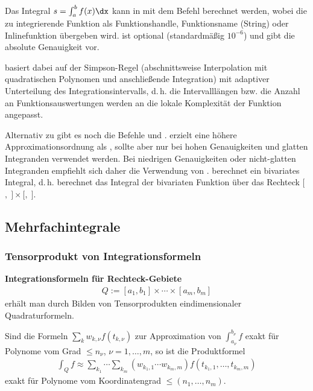 Das Integral $s = \int_a^b f(x)\dx$ kann in \matlab{} mit dem Befehl
 berechnet werden,
wobei die zu integrierende Funktion  als Funktionshandle, Funktionsname
(String) oder Inlinefunktion übergeben wird.
 ist optional (standardmäßig $10^{-6}$) und gibt die absolute
Genauigkeit vor.

 basiert dabei auf der Simpson-Regel
(abschnittsweise Interpolation mit quadratischen Polynomen und anschließende
Integration) mit adaptiver Unterteilung des Integrationsintervalls, d.\,h.
die Intervalllängen bzw. die Anzahl an Funktionsauswertungen werden an
die lokale Komplexität der Funktion angepasst.

Alternativ zu  gibt es noch die Befehle  und
.
 erzielt eine höhere Approximationsordnung als ,
sollte aber nur bei hohen Genauigkeiten und glatten Integranden verwendet
werden.
Bei niedrigen Genauigkeiten oder nicht-glatten Integranden empfiehlt sich daher
die Verwendung von .
 berechnet ein bivariates Integral, d.\,h.
 berechnet
das Integral der bivariaten Funktion  über das Rechteck
$[$$,\;$$] \times [$$,\;$$]$.

\pagebreak

\subsection{%
    Mehrfachintegrale%
}

\subsubsection{%
    Tensorprodukt von Integrationsformeln%
}

\textbf{Integrationsformeln für Rechteck-Gebiete}
\begin{align*}
    Q := [a_1, b_1] \times \dotsb \times [a_m, b_m]
\end{align*}
erhält man durch Bilden von Tensorprodukten eindimensionaler Quadraturformeln.

Sind die Formeln $\sum_k w_{k,\nu} f(t_{k,\nu})$ zur Approximation von
$\int_{a_\nu}^{b_\nu} f$ exakt für Polynome vom Grad $\le n_\nu$,
$\nu = 1, \dotsc, m$, so ist die Produktformel
\begin{align*}
    \int_Q f \approx
    \sum_{k_1} \dotsb \sum_{k_m} (w_{k_1,1} \dotsb w_{k_m,m})
    f(t_{k_1,1}, \dotsc, t_{k_m,m})
\end{align*}
exakt für Polynome vom Koordinatengrad $\le (n_1, \dotsc, n_m)$.

